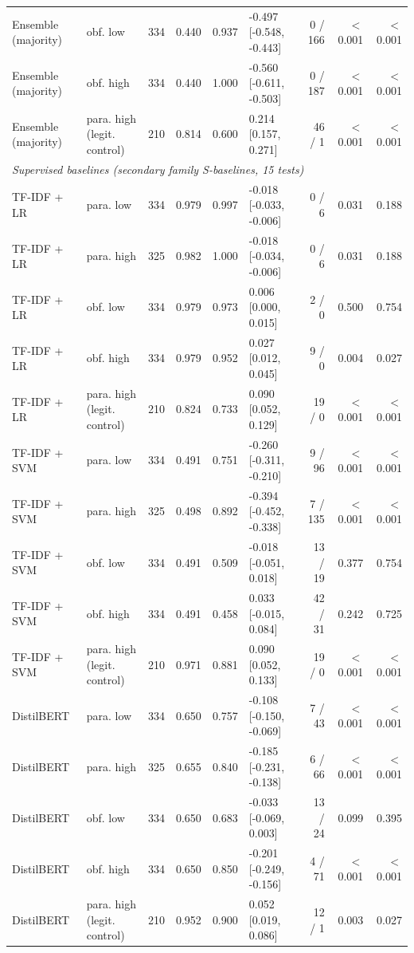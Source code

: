 \begin{tabular}{llrrrlrrr}
Ensemble (majority) & obf. low & 334 & 0.440 & 0.937 & -0.497 [-0.548, -0.443] & 0 / 166 & $<$0.001 & $<$0.001 \\
Ensemble (majority) & obf. high & 334 & 0.440 & 1.000 & -0.560 [-0.611, -0.503] & 0 / 187 & $<$0.001 & $<$0.001 \\
Ensemble (majority) & para. high (legit. control) & 210 & 0.814 & 0.600 & 0.214 [0.157, 0.271] & 46 / 1 & $<$0.001 & $<$0.001 \\
\midrule
\multicolumn{9}{l}{\textit{Supervised baselines (secondary family S-baselines, 15 tests)}} \\
TF-IDF + LR & para. low & 334 & 0.979 & 0.997 & -0.018 [-0.033, -0.006] & 0 / 6 & 0.031 & 0.188 \\
TF-IDF + LR & para. high & 325 & 0.982 & 1.000 & -0.018 [-0.034, -0.006] & 0 / 6 & 0.031 & 0.188 \\
TF-IDF + LR & obf. low & 334 & 0.979 & 0.973 & 0.006 [0.000, 0.015] & 2 / 0 & 0.500 & 0.754 \\
TF-IDF + LR & obf. high & 334 & 0.979 & 0.952 & 0.027 [0.012, 0.045] & 9 / 0 & 0.004 & 0.027 \\
TF-IDF + LR & para. high (legit. control) & 210 & 0.824 & 0.733 & 0.090 [0.052, 0.129] & 19 / 0 & $<$0.001 & $<$0.001 \\
TF-IDF + SVM & para. low & 334 & 0.491 & 0.751 & -0.260 [-0.311, -0.210] & 9 / 96 & $<$0.001 & $<$0.001 \\
TF-IDF + SVM & para. high & 325 & 0.498 & 0.892 & -0.394 [-0.452, -0.338] & 7 / 135 & $<$0.001 & $<$0.001 \\
TF-IDF + SVM & obf. low & 334 & 0.491 & 0.509 & -0.018 [-0.051, 0.018] & 13 / 19 & 0.377 & 0.754 \\
TF-IDF + SVM & obf. high & 334 & 0.491 & 0.458 & 0.033 [-0.015, 0.084] & 42 / 31 & 0.242 & 0.725 \\
TF-IDF + SVM & para. high (legit. control) & 210 & 0.971 & 0.881 & 0.090 [0.052, 0.133] & 19 / 0 & $<$0.001 & $<$0.001 \\
DistilBERT & para. low & 334 & 0.650 & 0.757 & -0.108 [-0.150, -0.069] & 7 / 43 & $<$0.001 & $<$0.001 \\
DistilBERT & para. high & 325 & 0.655 & 0.840 & -0.185 [-0.231, -0.138] & 6 / 66 & $<$0.001 & $<$0.001 \\
DistilBERT & obf. low & 334 & 0.650 & 0.683 & -0.033 [-0.069, 0.003] & 13 / 24 & 0.099 & 0.395 \\
DistilBERT & obf. high & 334 & 0.650 & 0.850 & -0.201 [-0.249, -0.156] & 4 / 71 & $<$0.001 & $<$0.001 \\
DistilBERT & para. high (legit. control) & 210 & 0.952 & 0.900 & 0.052 [0.019, 0.086] & 12 / 1 & 0.003 & 0.027 \\
\bottomrule
\end{tabular}
